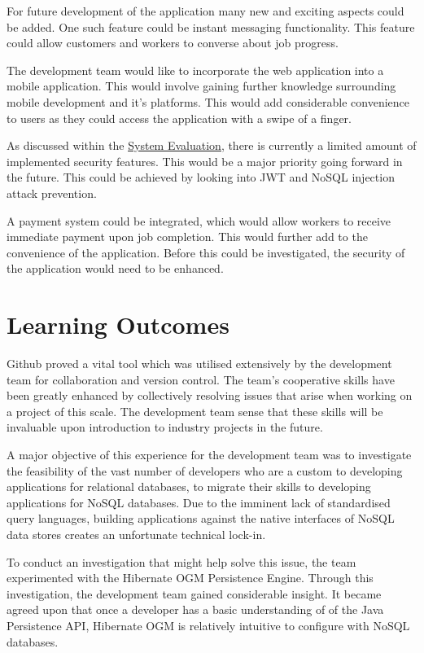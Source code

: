 For future development of the application many new and exciting aspects could be added. One such feature could be instant messaging functionality. This feature could allow customers and workers to converse about job progress.

The development team would like to incorporate the web application into a mobile application. This would involve gaining further knowledge surrounding mobile development and it's platforms. This would add considerable convenience to users as they could access the application with a swipe of a finger.


As discussed within the \hyperref[sec:SystemEvaluationLimitations]{\underline{System Evaluation}}, there is currently a limited amount of implemented security features. This would be a major priority going forward in the future. This could be achieved by looking into JWT and NoSQL injection attack prevention.

A payment system could be integrated, which would allow workers to receive immediate payment upon job completion. This would further add to the convenience of the application. Before this could be investigated, the security of the application would need to be enhanced.

\section{Learning Outcomes}
\label{sec:ConclusionLearningOutcomes}

Github proved a vital tool which was utilised extensively by the development team for collaboration and version control. The team's cooperative skills have been greatly enhanced by collectively resolving issues that arise when working on a project of this scale. The development team sense that these skills will be invaluable upon introduction to industry projects in the future.

\bigskip

A major objective of this experience for the development team was to investigate the feasibility of the vast number of developers who are a custom to developing applications for relational databases, to migrate their skills to developing applications for NoSQL databases. Due to the imminent lack of standardised query languages, building applications against the native interfaces of NoSQL data stores creates an unfortunate technical lock-in.

To conduct an investigation that might help solve this issue, the team experimented with the Hibernate OGM Persistence Engine. Through this investigation, the development team gained considerable insight. It became agreed upon that once a developer has a basic understanding of of the Java Persistence API, Hibernate OGM is relatively intuitive to configure with NoSQL databases. 

